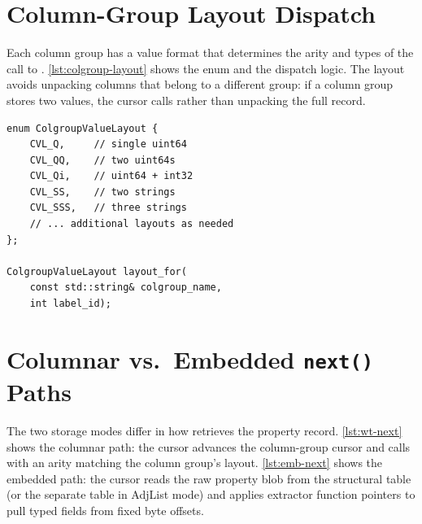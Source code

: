 \section{Column-Group Layout Dispatch}
\label{appendix:colgroup-layout}

Each column group has a value format that determines the arity and types of the  call to \wt{}.
\autoref{lst:colgroup-layout} shows the  enum and the dispatch logic.
The layout avoids unpacking columns that belong to a different group: if a column group stores two  values, the cursor calls  rather than unpacking the full record.

\begin{lstlisting}[style=cpp, label={lst:colgroup-layout}, caption={\code{ColgroupValueLayout} enum and accessor dispatch.}, captionpos=b]
enum ColgroupValueLayout {
    CVL_Q,     // single uint64
    CVL_QQ,    // two uint64s
    CVL_Qi,    // uint64 + int32
    CVL_SS,    // two strings
    CVL_SSS,   // three strings
    // ... additional layouts as needed
};

ColgroupValueLayout layout_for(
    const std::string& colgroup_name,
    int label_id);
\end{lstlisting}

\section{Columnar vs.\ Embedded \texttt{next()} Paths}
\label{appendix:next-paths}

The two storage modes differ in how  retrieves the property record.
\autoref{lst:wt-next} shows the columnar path: the cursor advances the \wt{} column-group cursor and calls  with an arity matching the column group's layout.
\autoref{lst:emb-next} shows the embedded path: the cursor reads the raw property blob from the structural table (or the separate  table in AdjList mode) and applies extractor function pointers to pull typed fields from fixed byte offsets.

